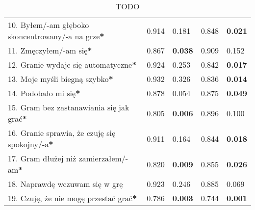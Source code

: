 \begin{table}[h!]
\begin{center}
\begin{tabular}{|m{10em}|m{5em}|m{5em}|m{5em}|m{5em}|}
            10. Byłem/-am głęboko \newline skoncentrowany/-a \newline na grze\textbf{*} & 0.914                       & 0.181            & 0.848                   & \textbf{0.021} \\
            11. Zmęczyłem/-am się\textbf{*}                                             & 0.867                       & \textbf{0.038}   & 0.909                   & 0.152          \\
            12. Granie wydaje się automatyczne\textbf{*}                                & 0.924                       & 0.253            & 0.842                   & \textbf{0.017} \\
            13. Moje myśli \newline biegną szybko\textbf{*}                             & 0.932                       & 0.326            & 0.836                   & \textbf{0.014} \\
            14. Podobało mi się\textbf{*}                                               & 0.878                       & 0.054            & 0.875                   & \textbf{0.049} \\
            15. Gram bez zastanawiania się jak grać\textbf{*}                           & 0.805                       & \textbf{0.006}   & 0.896                   & 0.100          \\
            16. Granie sprawia, \newline że czuję się spokojny/-a\textbf{*}             & 0.911                       & 0.164            & 0.844                   & \textbf{0.018} \\
            17. Gram dłużej \newline niż zamierzałem/-am\textbf{*}                      & 0.820                       & \textbf{0.009}   & 0.855                   & \textbf{0.026} \\
            18. Naprawdę wczuwam się w grę                                              & 0.923                       & 0.246            & 0.885                   & 0.069          \\
            19. Czuję, że nie mogę przestać grać\textbf{*}                              & 0.786                       & \textbf{0.003}   & 0.744                   & \textbf{0.001} \\
            \hline
        \end{tabular}
    \end{center}
    \caption{TODO}\label{tab1:ch7_10}
\end{table}

